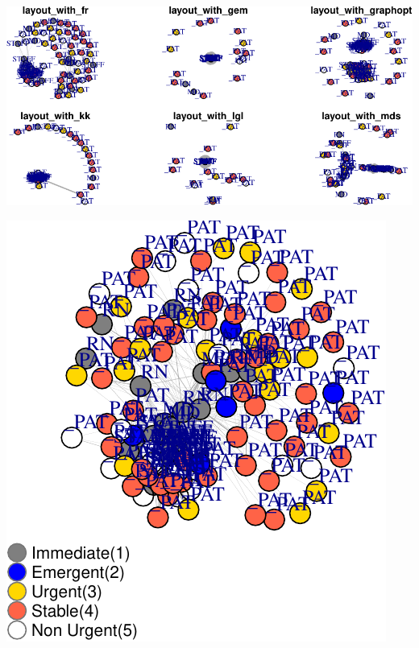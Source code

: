 \documentclass[]{elsarticle} %
\makeatletter
\def\maxwidth{\ifdim\Gin@nat@width>\linewidth\linewidth
\else\Gin@nat@width\fi}
\let\Oldincludegraphics\includegraphics
\renewcommand{\includegraphics}[1]{\Oldincludegraphics[width=\maxwidth]{#1}}
\makeatother
\begin{document}
\includegraphics{Flynn_Project_files/figure-latex/shift23-2.pdf}

\includegraphics{Flynn_Project_files/figure-latex/shift13-1.pdf}
\end{document}
